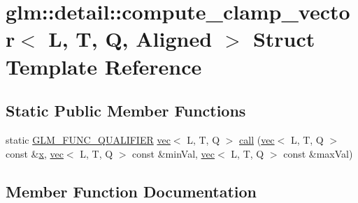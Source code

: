 \hypertarget{structglm_1_1detail_1_1compute__clamp__vector}{}\section{glm\+:\+:detail\+:\+:compute\+\_\+clamp\+\_\+vector$<$ L, T, Q, Aligned $>$ Struct Template Reference}
\label{structglm_1_1detail_1_1compute__clamp__vector}
\subsection*{Static Public Member Functions}
\begin{DoxyCompactItemize}
\item 
static \hyperlink{setup_8hpp_a33fdea6f91c5f834105f7415e2a64407}{G\+L\+M\+\_\+\+F\+U\+N\+C\+\_\+\+Q\+U\+A\+L\+I\+F\+I\+ER} \hyperlink{structglm_1_1vec}{vec}$<$ L, T, Q $>$ \hyperlink{structglm_1_1detail_1_1compute__clamp__vector_a19b42e5fd410e11d2318498e84658562}{call} (\hyperlink{structglm_1_1vec}{vec}$<$ L, T, Q $>$ const \&\hyperlink{_s_d_l__opengl_8h_ad0e63d0edcdbd3d79554076bf309fd47}{x}, \hyperlink{structglm_1_1vec}{vec}$<$ L, T, Q $>$ const \&min\+Val, \hyperlink{structglm_1_1vec}{vec}$<$ L, T, Q $>$ const \&max\+Val)
\end{DoxyCompactItemize}


\subsection{Member Function Documentation}
\mbox{\label{structglm_1_1detail_1_1compute__clamp__vector_a19b42e5fd410e11d2318498e84658562}} 
